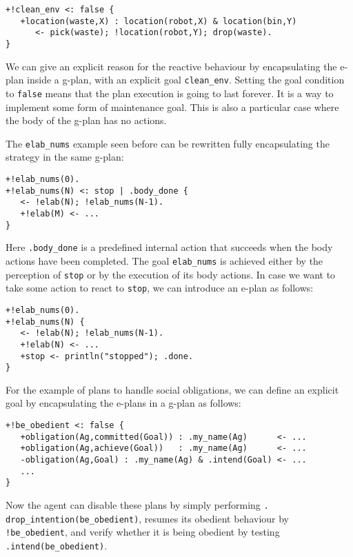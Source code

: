 \begin{small}
\begin{verbatim}
+!clean_env <: false {
   +location(waste,X) : location(robot,X) & location(bin,Y)
      <- pick(waste); !location(robot,Y); drop(waste).
}
\end{verbatim}
\end{small}

\noindent We can give an explicit reason for the reactive behaviour by encapsulating the e-plan inside a g-plan, with an explicit goal \texttt{clean\_env}.
%
Setting the goal condition to \texttt{false} means that the plan
execution is going to last forever. It is a way to implement some form
of maintenance goal.
%
This is also a particular case where the body of the g-plan has no actions.
%

The \texttt{elab\_nums} example seen before can be rewritten fully encapsulating the strategy in the same g-plan:

{\small
\begin{verbatim}
+!elab_nums(0).
+!elab_nums(N) <: stop | .body_done {
   <- !elab(N); !elab_nums(N-1).	
   +!elab(M) <- ...
}
\end{verbatim}}

\noindent Here \texttt{.body\_done} is a predefined internal action that succeeds when the body actions have been completed. The goal \texttt{elab\_nums} is achieved either by the perception of \texttt{stop} or by the execution of its body actions.
%
In case we want to take some action to react to \texttt{stop}, we can introduce an e-plan as follows:

{\small
\begin{verbatim}
+!elab_nums(0).
+!elab_nums(N) {
   <- !elab(N); !elab_nums(N-1).
   +!elab(N) <- ...
   +stop <- println("stopped"); .done.
}
\end{verbatim}}

For the example of plans to handle social obligations, we can define an explicit goal by encapsulating the e-plans in a g-plan as follows:
\begin{small}
\begin{verbatim}
+!be_obedient <: false {
   +obligation(Ag,committed(Goal)) : .my_name(Ag)      <- ...
   +obligation(Ag,achieve(Goal))   : .my_name(Ag)      <- ...
   -obligation(Ag,Goal) : .my_name(Ag) & .intend(Goal) <- ...
   ...
}
\end{verbatim}
\end{small}
\noindent Now the agent can disable these plans by simply performing \texttt{. drop\_intention(be\_obedient)}, resumes its obedient behaviour by \texttt{!be\_obedient}, and verify whether it is being obedient by testing \texttt{.intend(be\_obedient)}.

